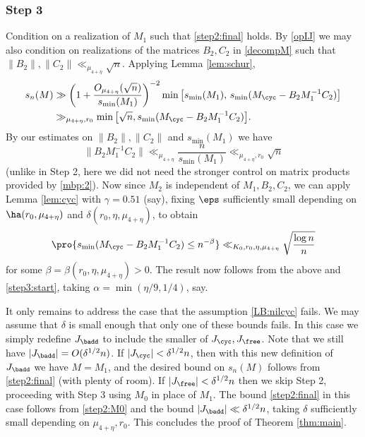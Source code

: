 \documentclass[aop,preprint]{imsart}
\theoremstyle{plain}
\theoremstyle{definition}
\theoremstyle{remark}
\numberwithin{equation}{section}
\numberwithin{theorem}{section}
\begin{document}
\subsubsection*{Step 3} 
Condition on a realization of $M_1$ such that \eqref{step2:final} holds.
By \eqref{opIJ} we may also condition on realizations of the matrices $B_2,C_2$ in \eqref{decompM} such that $\|B_2\|,\|C_2\| \ll_{\mu_{4+\eta}}\sqrt{n}$.
Applying Lemma \ref{lem:schur}, 
\begin{align}
s_n(M) 
&\gg \left( 1+ \frac{O_{\mu_{4+\eta}}(\sqrt{n})}{s_{\min}(M_1)}\right)^{-2} \min \big[ s_{\min}(M_1), \, 
s_{\min}(M_{\cyc} - B_2 M_1^{-1} C_2) \big] 	\notag\\
& \gg_{\mu_{4+\eta},r_0} \min \big[ \sqrt{n}, s_{\min}(M_{\cyc} - B_2 M_1^{-1} C_2) \big].	\label{step3:start}
\end{align}
By our estimates on $\|B_2\|,\|C_2\|$ and $s_{\min}(M_1)$ we have
\begin{equation}
\|B_2M_1^{-1}C_2\| \ll_{\mu_{4+\eta}} \frac{ n}{s_{\min}(M_1)} \ll_{\mu_{4+\eta},r_0} \sqrt{n}
\end{equation}
(unlike in Step 2, here we did not need the stronger control on matrix products provided by \eqref{mbp:2}). 
Now since $M_2$ is independent of $M_1,B_2,C_2$, we can apply Lemma \ref{lem:cyc} with $\gamma=0.51$ (say), fixing $\eps$ sufficiently small depending on $\ha(r_0,\mu_{4+\eta})$ and $\delta(r_0,\eta,\mu_{4+\eta})$, to obtain
\begin{equation}
\pro{ s_{\min}(M_{\cyc} - B_2 M_1^{-1} C_2) \le n^{-\beta}} \ll_{K_0, r_0,\eta,\mu_{4+\eta}} \sqrt{\frac{\log n}{n}}
\end{equation}
for some $\beta = \beta(r_0,\eta,\mu_{4+\eta})>0$.
The result now follows from the above and \eqref{step3:start}, taking $\alpha=\min(\eta/9,1/4)$, say.

It only remains to address the case that the assumption \eqref{LB:nilcyc} fails. 
We may assume that $\delta$ is small enough that only one of these bounds fails. 
In this case we simply redefine $J_{\badd}$ to include the smaller of $J_{\cyc}, J_{\free}$. 
Note that we still have $|J_{\badd}|= O(\delta^{1/2}n)$.
If $|J_{\cyc}|<\delta^{1/2}n$, then with this new definition of $J_{\badd}$ we have $M=M_1$, and the desired bound on $s_n(M)$ follows from \eqref{step2:final} (with plenty of room). 
If $|J_{\free}|< \delta^{1/2}n$ then we skip Step 2, proceeding with Step 3 using $M_0$ in place of $M_1$. The bound \eqref{step2:final} in this case follows from \eqref{step2:M0} and the bound $|J_{\badd}|\ll \delta^{1/2}n$, taking $\delta$ sufficiently small depending on $\mu_{4+\eta},r_0$.
This concludes the proof of Theorem \ref{thm:main}.
\end{document}
